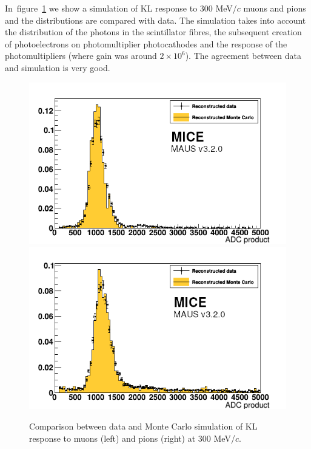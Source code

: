 In~figure~\ref{fig:KL_mc_vs_data} we show a simulation of KL response to 300 MeV/$c$ muons and pions and the distributions are compared with data.
The simulation takes into account the distribution of the photons in the scintillator fibres, the subsequent creation of photoelectrons on photomultiplier photocathodes and the response of the photomultipliers (where gain was around $2 \times 10^6$).
The agreement between data and simulation is very good.


   \begin{figure}[htb!]
   	\begin{center}
   		\includegraphics[width=0.4\columnwidth]{./04-KL/Figures/muon_mc_vs_data_edited.png}  		\includegraphics[width=0.4\columnwidth]{./04-KL/Figures/pion_mc_vs_data_edited.png}
   		\caption{Comparison between data and Monte Carlo simulation of KL response to muons (left) and pions (right) at 300 MeV/$c$.}
   		\label{fig:KL_mc_vs_data}
   	\end{center}
   \end{figure}
